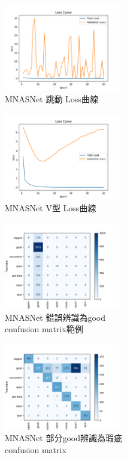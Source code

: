 %
\begin{figure}[htbp]
    \centering
    \includegraphics[width=0.45\textwidth]{./img/MNASNet/P1.png}
    \caption{MNASNet 跳動 Loss曲線}
    \label{fig:MNASNet_P1}
\end{figure}
\begin{figure}[htbp]
    \centering
    \includegraphics[width=0.45\textwidth]{./img/MNASNet/P2.png}
    \caption{MNASNet V型 Loss曲線}
    \label{fig:MNASNet_P2}
\end{figure}
\begin{figure}[htbp]
    \centering
    \includegraphics[width=0.45\textwidth]{./img/MNASNet/P3.png}
    \caption{MNASNet 錯誤辨識為good\protect\\
             confusion matrix範例}
    \label{fig:MNASNet_P3}
\end{figure}
\begin{figure}[htbp]
    \centering
    \includegraphics[width=0.45\textwidth]{./img/MNASNet/P4.png}
    \caption{MNASNet 部分good辨識為瑕疵\protect\\
             confusion matrix}
    \label{fig:MNASNet_P4}
\end{figure}
